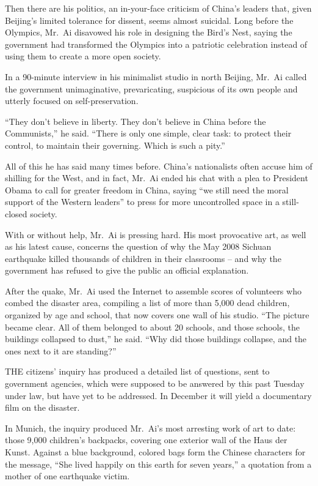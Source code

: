 ﻿\documentclass[12pt]{article}
\begin{document}
Then there are his politics, an in-your-face criticism of China's leaders that, given Beijing's
limited tolerance for dissent, seems almost suicidal. Long before the Olympics, Mr.~Ai disavowed his
role in designing the Bird's Nest, saying the government had transformed the Olympics into a
patriotic celebration instead of using them to create a more open society.

In a 90-minute interview in his minimalist studio in north Beijing, Mr.~Ai called the government
unimaginative, prevaricating, suspicious of its own people and utterly focused on self-preservation.

``They don't believe in liberty. They don't believe in China before the Communists,'' he said.
``There is only one simple, clear task: to protect their control, to maintain their governing. Which
is such a pity.''

All of this he has said many times before. China's nationalists often accuse him of shilling for the
West, and in fact, Mr.~Ai ended his chat with a plea to President Obama to call for greater freedom
in China, saying ``we still need the moral support of the Western leaders'' to press for more
uncontrolled space in a still-closed society.

With or without help, Mr.~Ai is pressing hard. His most provocative art, as well as his latest
cause, concerns the question of why the May 2008 Sichuan earthquake killed thousands of children in
their classrooms -- and why the government has refused to give the public an official explanation.

After the quake, Mr.~Ai used the Internet to assemble scores of volunteers who combed the disaster
area, compiling a list of more than 5,000 dead children, organized by age and school, that now
covers one wall of his studio. ``The picture became clear. All of them belonged to about 20 schools,
and those schools, the buildings collapsed to dust,'' he said. ``Why did those buildings collapse,
and the ones next to it are standing?''

THE citizens' inquiry has produced a detailed list of questions, sent to government agencies, which
were supposed to be answered by this past Tuesday under law, but have yet to be addressed. In
December it will yield a documentary film on the disaster.

In Munich, the inquiry produced Mr.~Ai's most arresting work of art to date: those 9,000 children's
backpacks, covering one exterior wall of the Haus der Kunst. Against a blue background, colored bags
form the Chinese characters for the message, ``She lived happily on this earth for seven years,'' a
quotation from a mother of one earthquake victim.
\end{document}
